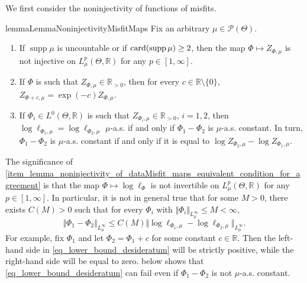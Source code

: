 \documentclass[a4paper]{scrartcl}
\theoremstyle{definition}
\numberwithin{equation}{section}
\newcommand{\R}{\mathbb{R}}
\newcommand{\card}[1]{\textup{card}({#1})}
\DeclareMathOperator{\supp}{supp}
\newcommand{\norm}[1]{\Vert #1 \Vert}
\begin{document}
We first consider the noninjectivity of functions of misfits.
\begin{restatable}{lemma}{LemmaNoninjectivityMisfitMaps}
 \label{lemma_noninjectivity_of_dataMisfit_maps}
Fix an arbitrary $\mu\in\mathcal{P}(\Theta)$.  
 \begin{enumerate}
  \item If $\supp{\mu}$ is uncountable or if $\card{\supp{\mu}}\geq 2$, then the map $\Phi\mapsto Z_{\Phi,\mu}$ is not injective on $L^p_\mu(\Theta,\R)$ for any $p\in [1,\infty]$.
  \label{item_lemma_noninjectivity_of_dataMisfit_maps_noninjective}
  \item If $\Phi$ is such that $Z_{\Phi,\mu} \in \R_{>0}$, then for every $c\in\R\setminus\{0\}$, $Z_{\Phi+c,\mu}=\exp(-c) Z_{\Phi,\mu}$.
   \label{item_lemma_noninjectivity_of_dataMisfit_maps_noninvariance_under_translations}
   \item If $\Phi_i\in L^0(\Theta,\R)$ is such that $Z_{\Phi_i,\mu}\in \R_{>0}$, $i=1,2$, then $\log \ell_{\Phi_1,\mu}=\log \ell_{\Phi_2,\mu}$ $\mu$-a.s. if and only if $\Phi_1-\Phi_2$ is $\mu$-a.s. constant. In turn, $\Phi_1-\Phi_2$ is $\mu$-a.s. constant if and only if it is equal to $\log Z_{\Phi_2,\mu}-\log Z_{\Phi_1,\mu}$.
 \label{item_lemma_noninjectivity_of_dataMisfit_maps_equivalent_condition_for_agreement}
 \end{enumerate}
\end{restatable}
The significance of \ref{item_lemma_noninjectivity_of_dataMisfit_maps_equivalent_condition_for_agreement} is that the map $\Phi\mapsto \log \ell_{\Phi} $ is not invertible on $L^p_\mu(\Theta,\R)$ for any $p\in [1,\infty]$.
In particular, it is not in general true that for some $M>0$, there exists $C(M)>0$ such that for every $\Phi_i$ with $\norm{\Phi_i}_{L^\infty_\mu}\leq M<\infty$, 
\begin{equation}
\label{eq_lower_bound_desideratum}
 \norm{\Phi_1-\Phi_2}_{L^\infty_\mu}\leq C(M) \norm{\log \ell_{\Phi_1,\mu}-\log\ell_{\Phi_2,\mu} }_{L^\infty_\mu}.
\end{equation}
For example, fix $\Phi_1$ and let $\Phi_2=\Phi_1+c$ for some constant $c\in\R$. Then the left-hand side in \eqref{eq_lower_bound_desideratum} will be strictly positive, while the right-hand side will be equal to zero. 
 below shows that \eqref{eq_lower_bound_desideratum} can fail even if $\Phi_1-\Phi_2$ is not $\mu$-a.s. constant.
\end{document}
